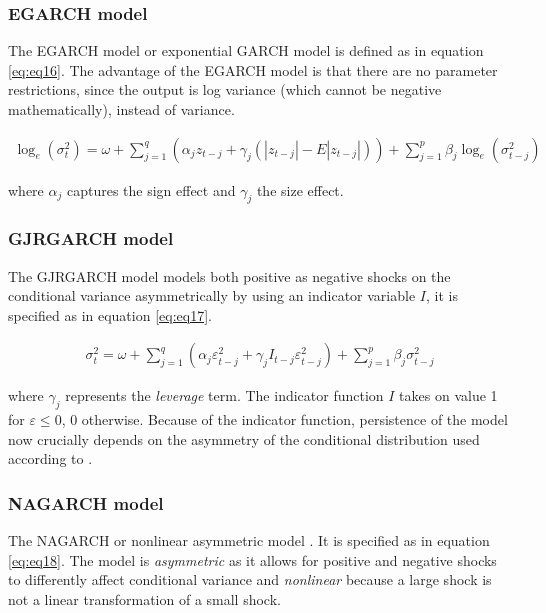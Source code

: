 \documentclass[a4paper, twoside]{templates/ociamthesis}
\begin{document}
\hypertarget{egarch-model}{%
\subsubsection{EGARCH model}\label{egarch-model}}

The EGARCH model or exponential GARCH model \autocite{nelson1991} is defined as in equation \eqref{eq:eq16}. The advantage of the EGARCH model is that there are no parameter restrictions, since the output is log variance (which cannot be negative mathematically), instead of variance.

\begin{align}
\log_e(\sigma_t^2) = \omega + \sum\limits_{j=1}^q (\alpha_j z_{t-j} + \gamma_j (|z_{t-j}| - E|z_{t-j}|))+ \sum\limits_{j = 1}^p \beta_j \log_e(\sigma_{t-j}^2)
 \label{eq:eq16}
\end{align}

where \(\alpha_j\) captures the sign effect and \(\gamma_j\) the size effect.

\hypertarget{gjrgarch-model}{%
\subsubsection{GJRGARCH model}\label{gjrgarch-model}}

The GJRGARCH model \autocite{glosten1993} models both positive as negative shocks on the conditional variance asymmetrically by using an indicator variable \(I\), it is specified as in equation \eqref{eq:eq17}.

\begin{align}
\sigma_t^2 = \omega + \sum\limits_{j=1}^q (\alpha_j \varepsilon_{t-j}^2 + \gamma_j I_{t-j} \varepsilon_{t-j}^2) + \sum\limits_{j = 1}^p \beta_j \sigma_{t-j}^2
 \label{eq:eq17}
\end{align}

where \(\gamma_j\) represents the \emph{leverage} term. The indicator function \(I\) takes on value 1 for \(\varepsilon \le 0\), 0 otherwise. Because of the indicator function, persistence of the model now crucially depends on the asymmetry of the conditional distribution used according to \textcite{ghalanos2020}.

\hypertarget{nagarch-model}{%
\subsubsection{NAGARCH model}\label{nagarch-model}}

The NAGARCH or nonlinear asymmetric model \autocite{engle1993}. It is specified as in equation \eqref{eq:eq18}. The model is \emph{asymmetric} as it allows for positive and negative shocks to differently affect conditional variance and \emph{nonlinear} because a large shock is not a linear transformation of a small shock.
\end{document}
